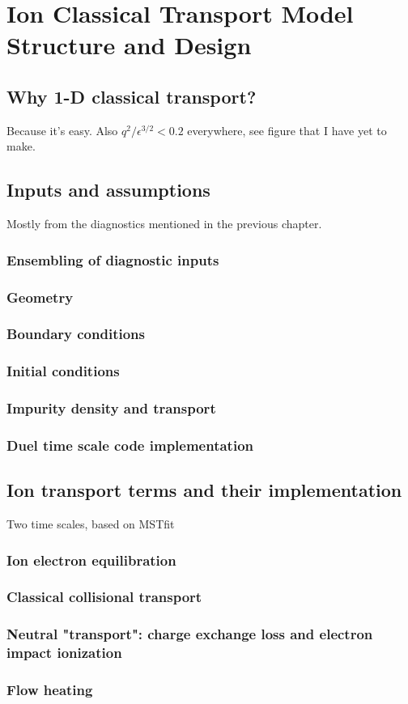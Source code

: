 \chapter{Ion Classical Transport Model Structure and Design}

\section{Why 1-D classical transport?}
Because it's easy. Also $q^2/\epsilon^{3/2} < 0.2$ everywhere, see figure that I have yet to make.

\section{Inputs and assumptions}
Mostly from the diagnostics mentioned in the previous chapter.

\subsection{Ensembling of diagnostic inputs}

\subsection{Geometry}

\subsection{Boundary conditions}

\subsection{Initial conditions}

\subsection{Impurity density and transport}

\subsection{Duel time scale code implementation}

\section{Ion transport terms and their implementation}
Two time scales, based on MSTfit

\subsection{Ion electron equilibration}

\subsection{Classical collisional transport}

\subsection{Neutral "transport": charge exchange loss and electron impact ionization}

\subsection{Flow heating}



